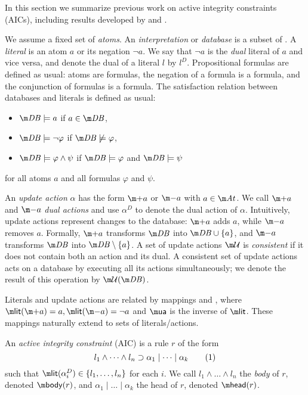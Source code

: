 In this section we summarize previous work on active integrity constraints (AICs), including results developed by \citet{ppdp/FlescaGZ04,iclp/CaropreseGSZ06,tplp/CaropreseT11} and \citet{tase/Cruz-FilipeEGN13}.

We assume a fixed set \atoms of \emph{atoms}. An \emph{interpretation} or \emph{database} is a subset of \atoms. A \emph{literal} is an atom $a$ or its negation $\lnot a$. 
We say that $\lnot a$ is the \emph{dual} literal of $a$ and vice versa, and denote the dual of a literal $l$ by $l^D$. 
Propositional formulas are defined as usual: atoms are formulas, the negation of a formula is a formula, and the conjunction of formulas is a formula. 
The satisfaction relation between databases \db and literals is defined as usual: 
\begin{itemize}
 \item $\db \models a$ if $a\in\db$,
 \item $\db \models \lnot \varphi$ if $\db\not\models \varphi$,
 \item $\db \models \varphi\land\psi$ if $\db\models \varphi$ and $\db \models \psi$
\end{itemize}
for all atoms $a$ and all formulas $\varphi$ and $\psi$.

An \emph{update action} $\alpha$ has the form $\add a$ or $\remove a$ with $a\in \atoms$. We call $\add a$ and $\remove a$ \emph{dual actions} and use $\alpha^D$ to denote the dual action of $\alpha$. 
Intuitively, update actions represent changes to the database: $\add a$ adds $a$, while $\remove a$ removes $a$. Formally, $\add a$ transforms $\db$ into $\db\cup\{a\}$, and $\remove a $ transforms $\db$ into $\db\setminus\{a\}$.
A set of update actions $\UU$ is \emph{consistent} if it does not contain both an action and its dual. A consistent set of update actions \UU acts on a database \db by executing all its actions simultaneously; we denote the result of this operation by $\UU(\db)$. 

Literals and update actions are related by mappings \litof and \actof, where $\litof(\add a)= a, \litof(\remove a) = \lnot a$ and $\actof$ is the inverse of $\litof$.
These mappings naturally extend to sets of literals/actions. 

\begin{definition}
 An \emph{active integrity constraint} (AIC) is a rule $r$ of the form
  \begin{equation} l_1\land \dots\land l_n\supset \alpha_1\mid\dots \mid \alpha_k \tag{1}\label{eq:aic}\end{equation}
  such that $\litof(\alpha_i^D) \in \{l_1,\dots,l_n\}$ for each $i$.
%  
  We call $l_1\land \dots \land l_n$ the \emph{body} of $r$, denoted $\body(r)$, and $\alpha_1\mid\dots \mid \alpha_k$ the head of $r$, denoted $\head (r)$.
\end{definition}


